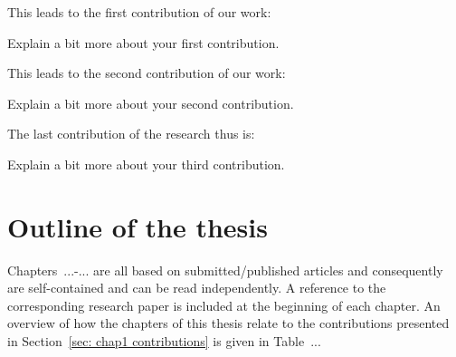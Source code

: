 
\lipsum[1-2] This leads to the first contribution of our work:


Explain a bit more about your first contribution.


\lipsum[4-5] This leads to the second contribution of our work:


Explain a bit more about your second contribution.


\lipsum[1-2] The last contribution of the research thus is:


Explain a bit more about your third contribution.


\section{Outline of the thesis}
\label{sec: chap1 outline}

\lipsum[10-12]

 Chapters~...-... are all based on submitted/published articles and consequently are self-contained and can be read independently. A reference to the corresponding research paper is included at the beginning of each chapter.
An overview of how the chapters of this thesis relate to the contributions presented in Section~\ref{sec: chap1 contributions} is given in Table~...

